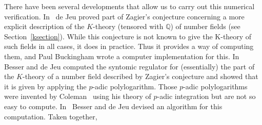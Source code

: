 \documentclass{amsart}
\begin{document}
There have been several developments that allow us to carry out this
numerical verification. In~\cite{dJ95} de Jeu proved part of Zagier's
conjecture concerning a more explicit description of the $ K $-theory
(tensored with $ {\mathbb Q} $) of number fields  (see Section~\ref{ksection}).
While this conjecture is not known to give the K-theory of such fields in all cases,
it does in practice.  Thus it provides a way of computing them, and Paul Buckingham
wrote a computer implementation for this.  In~\cite{BdJ03} Besser and de Jeu computed the syntomic regulator for
(essentially) the part of the $ K $-theory of a number field described by Zagier's conjecture
 and showed that it is given by applying the {$p$-adic{\futurelet{}}} polylogarithm.
Those {$p$-adic{\futurelet{}}} polylogarithms were invented by Coleman~\cite{Col82}
using his theory of {$p$-adic{\futurelet{}}} integration but are not so easy to
compute. In~\cite{BdJ06} Besser and de Jeu devised an
algorithm for this computation. Taken together,
\end{document}
